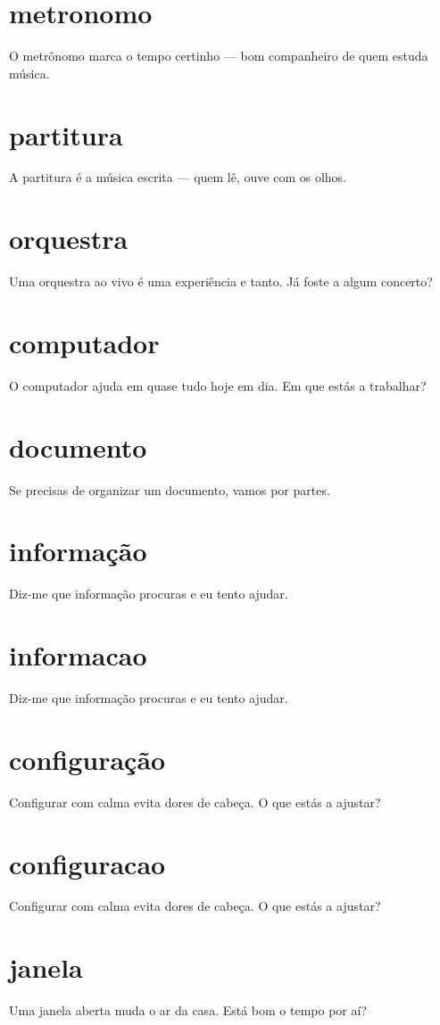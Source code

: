 \documentclass[11pt,a4paper]{article}
\begin{document}
\section{metronomo}
O metrônomo marca o tempo certinho --- bom companheiro de quem estuda música.

\section{partitura}
A partitura é a música escrita --- quem lê, ouve com os olhos.

\section{orquestra}
Uma orquestra ao vivo é uma experiência e tanto. Já foste a algum concerto?

\section{computador}
O computador ajuda em quase tudo hoje em dia. Em que estás a trabalhar?

\section{documento}
Se precisas de organizar um documento, vamos por partes.

\section{informação}
Diz-me que informação procuras e eu tento ajudar.

\section{informacao}
Diz-me que informação procuras e eu tento ajudar.

\section{configuração}
Configurar com calma evita dores de cabeça. O que estás a ajustar?

\section{configuracao}
Configurar com calma evita dores de cabeça. O que estás a ajustar?

\section{janela}
Uma janela aberta muda o ar da casa. Está bom o tempo por aí?
\end{document}
